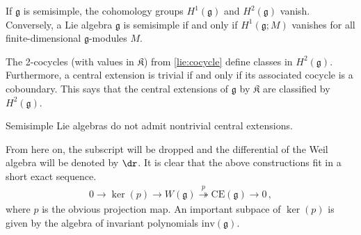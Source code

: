     \begin{property}
        If $\mathfrak{g}$ is semisimple, the cohomology groups $H^1(\mathfrak{g})$ and $H^2(\mathfrak{g})$ vanish. Conversely, a Lie algebra $\mathfrak{g}$ is semisimple if and only if $H^1(\mathfrak{g};M)$ vanishes for all finite-dimensional $\mathfrak{g}$-modules $M$.
    \end{property}

    \begin{property}
        The 2-cocycles (with values in $\mathfrak{K}$) from \cref{lie:cocycle} define classes in $H^2(\mathfrak{g})$. Furthermore, a central extension is trivial if and only if its associated cocycle is a coboundary. This says that the central extensions of $\mathfrak{g}$ by $\mathfrak{K}$ are classified by $H^2(\mathfrak{g})$.
    \end{property}
    \begin{result}
        Semisimple Lie algebras do not admit nontrivial central extensions.
    \end{result}


    From here on, the subscript will be dropped and the differential of the Weil algebra will be denoted by $\dr$. It is clear that the above constructions fit in a short exact sequence.
    \begin{gather}
        \label{lie:weil_algebra_sequence}
        0\rightarrow\ker(p)\rightarrow W(\mathfrak{g})\overset{p}{\twoheadrightarrow}\mathrm{CE}(\mathfrak{g})\rightarrow0\,,
    \end{gather}
    where $p$ is the obvious projection map. An important subpace of $\ker(p)$ is given by the algebra of invariant polynomials $\mathrm{inv}(\mathfrak{g})$.

